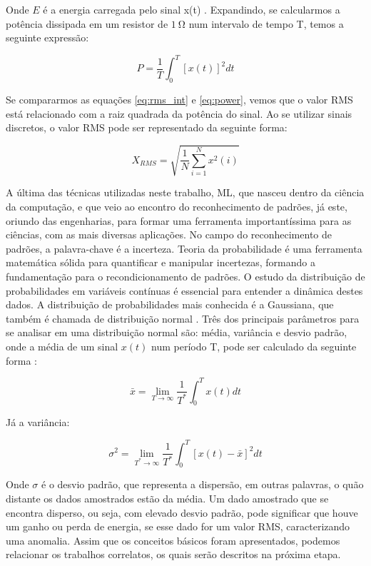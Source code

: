 Onde $E$ é a energia carregada pelo sinal x(t) \cite{Oppenheim2016}. Expandindo, se calcularmos a potência dissipada em um resistor de
$\SI{1}{\ohm}$ num intervalo de tempo T, temos a seguinte expressão:

\begin{equation}\label{eq:power}
    P = \frac{1}{T}\int_{0}^{T}{[x(t)]^2dt}
\end{equation}

Se compararmos as equações \ref{eq:rms_int} e \ref{eq:power}, vemos que o valor RMS está relacionado com a raiz quadrada da potência do 
sinal. Ao se utilizar sinais discretos, o valor RMS pode ser representado da seguinte forma:

\begin{equation}\label{eq:rms_disc}
    X_{RMS} = \sqrt{\frac{1}{N}\sum_{i=1}^{N}{x^2(i)}}
\end{equation}

A última das técnicas utilizadas neste trabalho, ML, que nasceu dentro da ciência da computação, e que veio ao encontro do reconhecimento de 
padrões, já este, oriundo das engenharias, para formar uma ferramenta importantíssima para as ciências, com as mais diversas
aplicações. No campo do reconhecimento de padrões, a palavra-chave é a incerteza. Teoria da probabilidade é uma ferramenta matemática sólida
para quantificar e manipular incertezas, formando a fundamentação para o recondicionamento de padrões. O estudo da 
distribuição de probabilidades em variáveis contínuas é essencial para entender a dinâmica destes dados. A distribuição de probabilidades mais
conhecida é a Gaussiana, que também é chamada de distribuição normal \cite{Andersen1986}. Três dos principais parâmetros para se analisar
em uma distribuição normal são: média, variância e desvio padrão, onde a média de um sinal $x(t)$ num período T, pode ser calculado da seguinte
forma \cite{Dinardo}:

\begin{equation}\label{eq:X_lim}
    \bar{x} = \lim_{T\rightarrow\infty}{\frac{1}{T^*}} \int_{0}^{T}{x(t)dt}
\end{equation}

Já a variância:

\begin{equation}\label{eq:variancia}
    \sigma^2 = \lim_{T^{*}\rightarrow\infty}{\frac{1}{T^*}} \int_{0}^{T}{[x(t)-\bar{x}]^2dt}
\end{equation}

Onde $\sigma$ é o desvio padrão, que representa a dispersão, em outras palavras, o quão distante os dados amostrados estão da média. Um dado
amostrado que se encontra disperso, ou seja, com elevado desvio padrão, pode significar que houve um ganho ou perda de energia, se esse dado
for um valor RMS, caracterizando uma anomalia. Assim que os conceitos básicos foram apresentados, podemos relacionar os trabalhos correlatos,
os quais serão descritos na próxima etapa.


